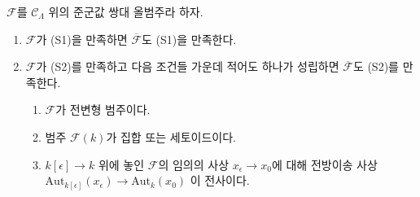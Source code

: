 \begin{lemma}
\label{lemma-S1-S2-associated-functor}
$\mathcal{F}$를 $\mathcal{C}_\Lambda$ 위의 준군값 쌍대 올범주라 하자.
\begin{enumerate}
\item $\mathcal{F}$가 (S1)을 만족하면
$\overline{\mathcal{F}}$도 (S1)을 만족한다.
\item $\mathcal{F}$가 (S2)를 만족하고 다음 조건들 가운데 적어도
하나가 성립하면 $\overline{\mathcal{F}}$도 (S2)를 만족한다.
\begin{enumerate}
\item $\mathcal{F}$가 전변형 범주이다.
\item 범주 $\mathcal{F}(k)$가 집합 또는 세토이드이다.
\item $k[\epsilon] \to k$ 위에 놓인 $\mathcal{F}$의 임의의 사상
$x_\epsilon \to x_0$에 대해 전방이송 사상
$\text{Aut}_{k[\epsilon]}(x_\epsilon) \to \text{Aut}_k(x_0)$
이 전사이다.
\end{enumerate}
\end{enumerate}
\end{lemma}

